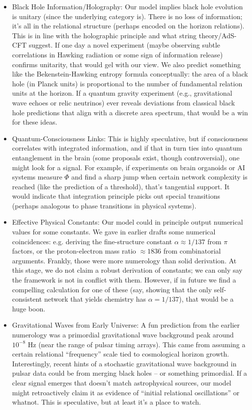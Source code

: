 \documentclass{article}
\begin{document}
\begin{itemize}
\item Black Hole Information/Holography: Our model implies black hole evolution is unitary (since the underlying category is). There is no loss of information; it's all in the relational structure (perhaps encoded on the horizon relations). This is in line with the holographic principle and what string theory/AdS-CFT suggest. If one day a novel experiment (maybe observing subtle correlations in Hawking radiation or some sign of information release) confirms unitarity, that would gel with our view. We also predict something like the Bekenstein-Hawking entropy formula conceptually: the area of a black hole (in Planck units) is proportional to the number of fundamental relation units at the horizon. If a quantum gravity experiment (e.g., gravitational wave echoes or relic neutrinos) ever reveals deviations from classical black hole predictions that align with a discrete area spectrum, that would be a win for these ideas.
\item Quantum-Consciousness Links: This is highly speculative, but if consciousness correlates with integrated information, and if that in turn ties into quantum entanglement in the brain (some proposals exist, though controversial), one might look for a signal. For example, if experiments on brain organoids or AI systems measure $\Phi$ and find a sharp jump when certain network complexity is reached (like the prediction of a threshold\cite{oizumi2014}), that’s tangential support. It would indicate that integration principle picks out special transitions (perhaps analogous to phase transitions in physical systems).
\item Effective Physical Constants: Our model could in principle output numerical values for some constants. We gave in earlier drafts some numerical coincidences: e.g. deriving the fine-structure constant $\alpha \approx 1/137$ from $\pi$ factors, or the proton-electron mass ratio $\approx 1836$ from combinatorial arguments. Frankly, those were more numerology than solid derivation. At this stage, we do not claim a robust derivation of constants; we can only say the framework is not in conflict with them. However, if in future we find a compelling calculation for one of these (say, showing that the only self-consistent network that yields chemistry has $\alpha = 1/137$), that would be a huge boon.
\item Gravitational Waves from Early Universe: A fun prediction from the earlier numerology was a primordial gravitational wave background peak around $10^{-8}$ Hz (near the range of pulsar timing arrays). This came from assuming a certain relational “frequency” scale tied to cosmological horizon growth. Interestingly, recent hints of a stochastic gravitational wave background in pulsar data could be from merging black holes – or something primordial. If a clear signal emerges that doesn’t match astrophysical sources, our model might retroactively claim it as evidence of “initial relational oscillations” or whatnot. This is speculative, but at least it’s a place to watch.

\end{itemize}
\end{document}
